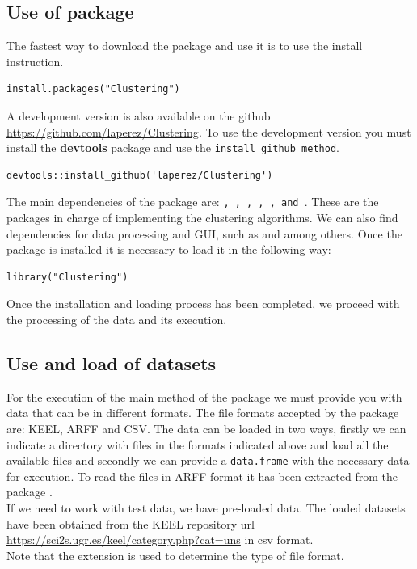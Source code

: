 \subsection{Use of  package}

The fastest way to download the  package and use it is to use the install instruction.

\begin{verbatim}
install.packages("Clustering")
\end{verbatim}

A development version is also available on the github \url{https://github.com/laperez/Clustering}. To use the development version you must install the \textbf{devtools} package and use the \texttt{install\_github method}.

\begin{verbatim}
devtools::install_github('laperez/Clustering')
\end{verbatim}

The main dependencies of the   package are: \texttt{, , , , ,  and }. These are the packages in charge of implementing the clustering algorithms. We can also find dependencies for data processing and GUI, such as \texttt{} and \texttt{} among others. Once the package is installed it is necessary to load it in the following way:

\begin{verbatim}
library("Clustering")
\end{verbatim}

Once the installation and loading process has been completed, we proceed with the processing of the data and its execution.

\subsection {Use and load of datasets}

For the execution of the main method of the package we must provide you with data that can be in different formats. The file formats accepted by the package are: KEEL, ARFF and CSV. The data can be loaded in two ways, firstly we can indicate a directory with files in the formats indicated above and load all the available files and secondly we can provide a \texttt{data.frame} with the necessary data for execution. To read the files in ARFF format it has been extracted from the  package \citep{b55}.\\
If we need to work with test data, we have pre-loaded data. The loaded datasets have been obtained from the KEEL repository url \url{https://sci2s.ugr.es/keel/category.php?cat=uns} in csv format.\\
Note that the extension is used to determine the type of file format.

